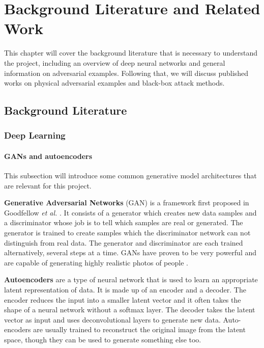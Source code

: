 \chapter{Background Literature and Related Work}
	\label{chap:background}
	
This chapter will cover the background literature that is necessary to understand the project, including an overview of deep neural networks and general information on adversarial examples. Following that, we will discuss published works on physical adversarial examples and black-box attack methods. 

\section{Background Literature}

\subsection{Deep Learning}
\subsubsection{GANs and autoencoders}
    
This subsection will introduce some common generative model architectures that are relevant for this project.

\textbf{Generative Adversarial Networks} (GAN) is a framework first proposed in Goodfellow \textit{et al.} \cite{gans}. It consists of a generator which creates new data samples and a discriminator whose job is to tell which samples are real or generated. The generator is trained to create samples which the discriminator network can not distinguish from real data. The generator and discriminator are each trained alternatively, several steps at a time. GANs have proven to be very powerful and are capable of generating highly realistic photos of people \cite{styleGAN}.

\textbf{Autoencoders} are a type of neural network that is used to learn an appropriate latent representation of data. It is made up of an encoder and a decoder. The encoder reduces the input into a smaller latent vector and it often takes the shape of a neural network without a softmax layer. The decoder takes the latent vector as input and uses deconvolutional layers to generate new data. Auto-encoders are usually trained to reconstruct the original image from the latent space, though they can be used to generate something else too.

